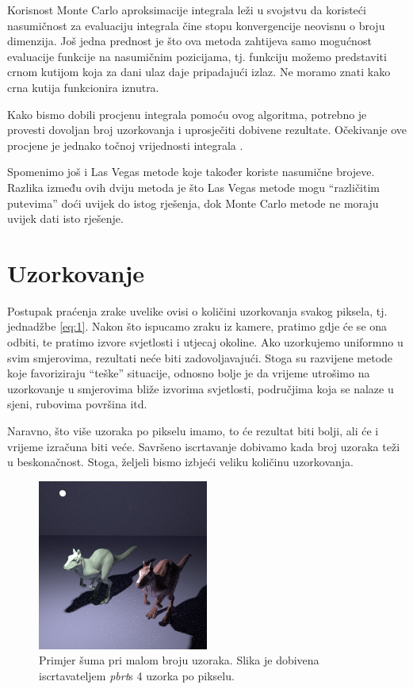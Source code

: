 \documentclass[times, utf8, seminar, numeric]{fer}
\begin{document}
Korisnost Monte Carlo aproksimacije integrala leži u svojstvu da koristeći nasumičnost za
evaluaciju integrala čine stopu konvergencije neovisnu o broju dimenzija. Još jedna prednost
je što ova metoda zahtijeva samo mogućnost evaluacije funkcije na nasumičnim pozicijama, tj.
funkciju možemo predstaviti crnom kutijom koja za dani ulaz daje pripadajući izlaz. Ne moramo
znati kako crna kutija funkcionira iznutra.

Kako bismo dobili procjenu integrala pomoću ovog algoritma, potrebno je provesti dovoljan broj
uzorkovanja i uprosječiti dobivene rezultate. Očekivanje ove procjene je jednako točnoj
vrijednosti integrala \cite{pbrbook}.

Spomenimo još i Las Vegas metode koje također koriste nasumične brojeve. Razlika između ovih dviju metoda je što Las Vegas metode mogu ``različitim putevima'' doći uvijek do istog rješenja, dok Monte Carlo metode ne moraju
uvijek dati isto rješenje.


\section{Uzorkovanje}
Postupak praćenja zrake uvelike ovisi o količini uzorkovanja svakog piksela, tj. jednadžbe \ref{eq:1}.
Nakon što ispucamo
zraku iz kamere, pratimo gdje će se ona odbiti, te pratimo izvore svjetlosti i utjecaj okoline.
Ako uzorkujemo uniformno u svim smjerovima, rezultati neće biti zadovoljavajući. Stoga su
razvijene metode koje favoriziraju “teške” situacije, odnosno bolje je da vrijeme utrošimo na
uzorkovanje u smjerovima bliže izvorima svjetlosti, područjima koja se nalaze u sjeni, rubovima
površina itd.

Naravno, što više uzoraka po pikselu imamo, to će rezultat biti bolji, ali će i vrijeme izračuna
biti veće. Savršeno iscrtavanje dobivamo kada broj uzoraka teži u beskonačnost. Stoga, željeli
bismo izbjeći veliku količinu uzorkovanja.

\begin{figure}[h]
\centering
\includegraphics[width=0.5\textwidth]{killeroo4.png}
\caption{Primjer šuma pri malom broju uzoraka. Slika je dobivena iscrtavateljem \textit{pbrt}\protect\footnotemark s 4 uzorka po pikselu.}
\label{fig:killeroo}
\end{figure}
\end{document}
